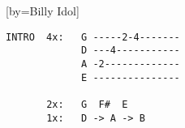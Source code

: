  

[by=Billy Idol]



\beginverse
\chordsoff
\begin{verbatim}
INTRO  4x:   G -----2-4-------
             D ---4-----------
             A -2-------------
             E ---------------

       2x:   G  F#  E
       1x:   D -> A -> B 
\end{verbatim}
\chordson
\endverse


